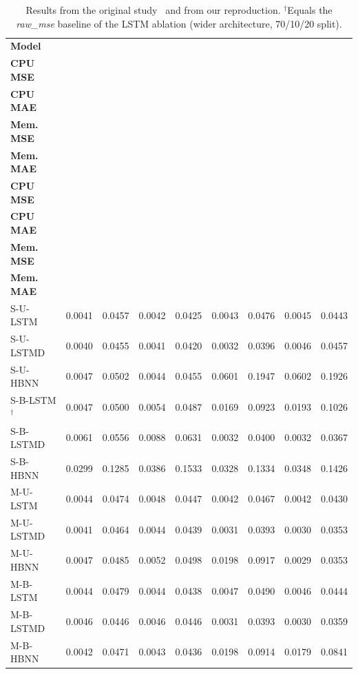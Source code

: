 \documentclass[conference]{IEEEtran}
\begin{document}
\begin{table}[!t]
\caption{Results from the original study~\cite{ref1} and from our reproduction.
$^\dagger$Equals the \emph{raw\_mse} baseline of the LSTM ablation (wider architecture, 70/10/20 split).}
\label{tab:repro}
\centering
\footnotesize
\setlength{\tabcolsep}{5pt}
\begin{tabular}{lcccccccc}
\toprule
\textbf{Model} &
\shortstack{\textbf{Reported}\\\textbf{CPU MSE}} &
\shortstack{\textbf{Reported}\\\textbf{CPU MAE}} &
\shortstack{\textbf{Reported}\\\textbf{Mem. MSE}} &
\shortstack{\textbf{Reported}\\\textbf{Mem. MAE}} &
\shortstack{\textbf{Reproduced}\\\textbf{CPU MSE}} &
\shortstack{\textbf{Reproduced}\\\textbf{CPU MAE}} &
\shortstack{\textbf{Reproduced}\\\textbf{Mem. MSE}} &
\shortstack{\textbf{Reproduced}\\\textbf{Mem. MAE}} \\
\midrule
S-U-LSTM   & 0.0041 & 0.0457 & 0.0042 & 0.0425 & 0.0043 & 0.0476 & 0.0045 & 0.0443 \\
S-U-LSTMD  & 0.0040 & 0.0455 & 0.0041 & 0.0420 & 0.0032 & 0.0396 & 0.0046 & 0.0457 \\
S-U-HBNN   & 0.0047 & 0.0502 & 0.0044 & 0.0455 & 0.0601 & 0.1947 & 0.0602 & 0.1926 \\
S-B-LSTM$^\dagger$   & 0.0047 & 0.0500 & 0.0054 & 0.0487 & 0.0169 & 0.0923 & 0.0193 & 0.1026 \\
S-B-LSTMD  & 0.0061 & 0.0556 & 0.0088 & 0.0631 & 0.0032 & 0.0400 & 0.0032 & 0.0367 \\
S-B-HBNN   & 0.0299 & 0.1285 & 0.0386 & 0.1533 & 0.0328 & 0.1334 & 0.0348 & 0.1426 \\
M-U-LSTM   & 0.0044 & 0.0474 & 0.0048 & 0.0447 & 0.0042 & 0.0467 & 0.0042 & 0.0430 \\
M-U-LSTMD  & 0.0041 & 0.0464 & 0.0044 & 0.0439 & 0.0031 & 0.0393 & 0.0030 & 0.0353 \\
M-U-HBNN   & 0.0047 & 0.0485 & 0.0052 & 0.0498 & 0.0198 & 0.0917 & 0.0029 & 0.0353 \\
M-B-LSTM   & 0.0044 & 0.0479 & 0.0044 & 0.0438 & 0.0047 & 0.0490 & 0.0046 & 0.0444 \\
M-B-LSTMD  & 0.0046 & 0.0446 & 0.0046 & 0.0446 & 0.0031 & 0.0393 & 0.0030 & 0.0359 \\
M-B-HBNN   & 0.0042 & 0.0471 & 0.0043 & 0.0436 & 0.0198 & 0.0914 & 0.0179 & 0.0841 \\
\bottomrule
\end{tabular}
\end{table}
\end{document}
